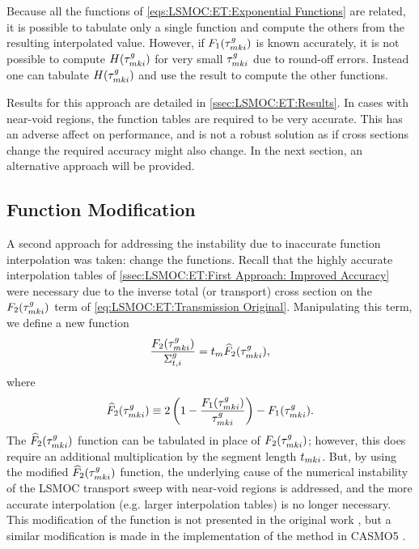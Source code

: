 {{{{        Because all the functions of \cref{eqs:LSMOC:ET:Exponential Functions} are related, it is possible to tabulate only a single function and compute the others from the resulting interpolated value.
        However, if $F_1(\segopt)$ is known accurately, it is not possible to compute $H(\segopt)$ for very small $\segopt$ due to round-off errors.
        Instead one can tabulate $H(\segopt)$ and use the result to compute the other functions.

        Results for this approach are detailed in \cref{ssec:LSMOC:ET:Results}.
        In cases with near-void regions, the function tables are required to be very accurate.
        This has an adverse affect on performance, and is not a robust solution as if cross sections change the required accuracy might also change.
        In the next section, an alternative approach will be provided.
      }
    }
    \subsection{Function Modification}{\label{ssec:LSMOC:ET:Function Modification}
      A second approach for addressing the instability due to inaccurate function interpolation was taken: change the functions.
      Recall that the highly accurate interpolation tables of \cref{ssec:LSMOC:ET:First Approach: Improved Accuracy} were necessary due to the inverse total (or transport) cross section on the $F_2(\segopt)$ term of \cref{eq:LSMOC:ET:Transmission Original}.
      Manipulating this term, we define a new function
      \begin{equation}\label{eq:LSMOC:ET:F2 Modified Definition}
        \frac{F_2(\segopt)}{\xst} = \nlen\modFunc,
      \end{equation}
      where
      \begin{equation}\label{eq:LSMOC:ET:F2 Modified}
        \modFunc \defined 2\left(1-\frac{F_1(\segopt)}{\segopt}\right) - F_1(\segopt).
      \end{equation}
      The $\modFunc$ function can be tabulated in place of $F_2(\segopt)$; however, this does require an additional multiplication by the segment length $\nsegl$.
      But, by using the modified $\modFunc$ function, the underlying cause of the numerical instability of the \ac{LSMOC} transport sweep with near-void regions is addressed, and the more accurate interpolation (e.g. larger interpolation tables) is no longer necessary.
      This modification of the function is not presented in the original work \cite{Ferrer2016}, but a similar modification is made in the implementation of the method in CASMO5 \cite{FerrerPersonalCommunications2019}.

}}}
